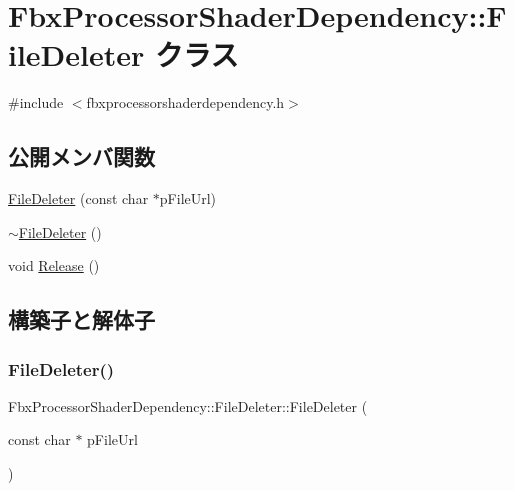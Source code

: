 \hypertarget{class_fbx_processor_shader_dependency_1_1_file_deleter}{}\section{Fbx\+Processor\+Shader\+Dependency\+:\+:File\+Deleter クラス}
\label{class_fbx_processor_shader_dependency_1_1_file_deleter}


{\ttfamily \#include $<$fbxprocessorshaderdependency.\+h$>$}

\subsection*{公開メンバ関数}
\begin{DoxyCompactItemize}
\item 
\hyperlink{class_fbx_processor_shader_dependency_1_1_file_deleter_af698d2ae1b5328fe6d4d236d3b1fdeea}{File\+Deleter} (const char $\ast$p\+File\+Url)
\item 
\hyperlink{class_fbx_processor_shader_dependency_1_1_file_deleter_a16ff5637056bea8b0b96234f874fcba5}{$\sim$\+File\+Deleter} ()
\item 
void \hyperlink{class_fbx_processor_shader_dependency_1_1_file_deleter_a23e8e0bc187b5625de18a905c2c2b75c}{Release} ()
\end{DoxyCompactItemize}


\subsection{構築子と解体子}
\mbox{\label{class_fbx_processor_shader_dependency_1_1_file_deleter_af698d2ae1b5328fe6d4d236d3b1fdeea}} 
\subsubsection{\texorpdfstring{File\+Deleter()}{FileDeleter()}}
{\footnotesize\ttfamily Fbx\+Processor\+Shader\+Dependency\+::\+File\+Deleter\+::\+File\+Deleter (\begin{DoxyParamCaption}\item[{const char $\ast$}]{p\+File\+Url }\end{DoxyParamCaption})}

